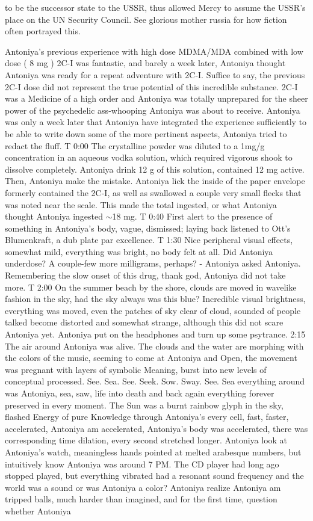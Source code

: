 \documentclass[12pt]{book}
\begin{document}
to be the successor state to the USSR, thus allowed Mercy to assume the USSR's place on the UN Security Council. See glorious mother russia for how fiction often portrayed this.



Antoniya's previous experience with high dose MDMA/MDA combined with low dose ( 8 mg ) 2C-I was fantastic, and barely a week later, Antoniya thought Antoniya was ready for a repeat adventure with 2C-I. Suffice to say, the previous 2C-I dose did not represent the true potential of this incredible substance. 2C-I was a Medicine of a high order and Antoniya was totally unprepared for the sheer power of the psychedelic ass-whooping Antoniya was about to receive. Antoniya was only a week later that Antoniya have integrated the experience sufficiently to be able to write down some of the more pertinent aspects, Antoniya tried to redact the fluff. T 0:00 The crystalline powder was diluted to a 1mg/g concentration in an aqueous vodka solution, which required vigorous shook to dissolve completely. Antoniya drink 12 g of this solution, contained 12 mg active. Then, Antoniya make the mistake. Antoniya lick the inside of the paper envelope formerly contained the 2C-I, as well as swallowed a couple very small flecks that was noted near the scale. This made the total ingested, or what Antoniya thought Antoniya ingested $\sim$18 mg. T 0:40 First alert to the presence of something in Antoniya's body, vague, dismissed; laying back listened to Ott's Blumenkraft, a dub plate par excellence. T 1:30 Nice peripheral visual effects, somewhat mild, everything was bright, no body felt at all. Did Antoniya underdose? A couple-few more milligrams, perhaps? - Antoniya asked Antoniya. Remembering the slow onset of this drug, thank god, Antoniya did not take more. T 2:00 On the summer beach by the shore, clouds are moved in wavelike fashion in the sky, had the sky always was this blue? Incredible visual brightness, everything was moved, even the patches of sky clear of cloud, sounded of people talked become distorted and somewhat strange, although this did not scare Antoniya yet. Antoniya put on the headphones and turn up some psytrance. 2:15 The air around Antoniya was alive. The clouds and the water are morphing with the colors of the music, seeming to come at Antoniya and Open, the movement was pregnant with layers of symbolic Meaning, burst into new levels of conceptual processed. See. Sea. See. Seek. Sow. Sway. See. Sea everything around was Antoniya, sea, saw, life into death and back again everything forever preserved in every moment. The Sun was a burnt rainbow glyph in the sky, flashed Energy of pure Knowledge through Antoniya's every cell, fast, faster, accelerated, Antoniya am accelerated, Antoniya's body was accelerated, there was corresponding time dilation, every second stretched longer. Antoniya look at Antoniya's watch, meaningless hands pointed at melted arabesque numbers, but intuitively know Antoniya was around 7 PM. The CD player had long ago stopped played, but everything vibrated had a resonant sound frequency and the world was a sound or was Antoniya a color? Antoniya realize Antoniya am tripped balls, much harder than imagined, and for the first time, question whether Antoniya 
\end{document}
